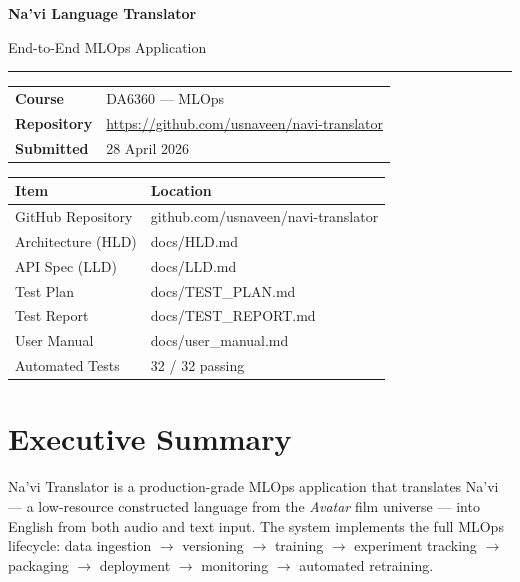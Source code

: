\documentclass[12pt,a4paper]{article}
\begin{document}
\begin{titlepage}
  \centering
  \vspace*{3cm}
  {\Huge\bfseries\color{accent} Na'vi Language Translator\par}
  \vspace{0.5cm}
  {\Large End-to-End MLOps Application\par}
  \vspace{1.5cm}
  \rule{0.6\textwidth}{0.4pt}
  \vspace{0.8cm}

  \begin{tabular}{ll}
    \textbf{Course}      & DA6360 --- MLOps \\[4pt]
    \textbf{Repository}  & \url{https://github.com/usnaveen/navi-translator} \\[4pt]
    \textbf{Submitted}   & 28 April 2026 \\
  \end{tabular}

  \vspace{2cm}

  \begin{tabular}{@{}L{5cm}L{8cm}@{}}
    \toprule
    \textbf{Item} & \textbf{Location} \\
    \midrule
    GitHub Repository  & github.com/usnaveen/navi-translator \\
    Architecture (HLD) & docs/HLD.md \\
    API Spec (LLD)     & docs/LLD.md \\
    Test Plan          & docs/TEST\_PLAN.md \\
    Test Report        & docs/TEST\_REPORT.md \\
    User Manual        & docs/user\_manual.md \\
    Automated Tests    & 32 / 32 passing \\
    \bottomrule
  \end{tabular}

\end{titlepage}

\tableofcontents
\newpage

\section{Executive Summary}

Na'vi Translator is a production-grade MLOps application that translates Na'vi --- a
low-resource constructed language from the \textit{Avatar} film universe --- into English
from both audio and text input. The system implements the full MLOps lifecycle:
data ingestion $\rightarrow$ versioning $\rightarrow$ training $\rightarrow$ experiment
tracking $\rightarrow$ packaging $\rightarrow$ deployment $\rightarrow$ monitoring
$\rightarrow$ automated retraining.
\end{document}
